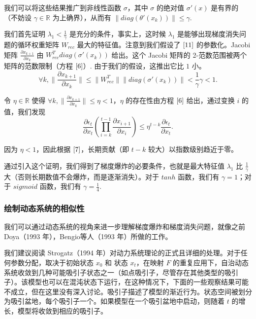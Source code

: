 我们可以将这些结果推广到非线性函数 \(\sigma\)，其中 \(\sigma\) 的绝对值 \(\sigma '(x)\) 是有界的（不妨设 \(\gamma\in\mathbb{R}\) 为上确界），从而有 \(\|diag(\theta '(x_k))\|\leq\gamma\).

我们首先证明 \(\lambda_1<\frac{1}{\gamma}\) 是充分的条件，事实上，这时候 \(\lambda_1\) 是能够出现梯度消失问题的循环权重矩阵 \(W_{rec}\) 最大的特征值。注意到我们假设了 \(\eqref{11}\) 的参数化。Jacobi 矩阵 \(\frac{\partial x_{k+1}}{\partial x_k}\) 由 \(W_{rec}^T diag(\sigma '(x_k))\) 给出。这个 Jacobi 矩阵的 2-范数范围被两个矩阵的范数限制（方程 \(\eqref{6}\)）. 由于我们的假设，这推出它比 \(1\) 小。
\begin{equation}\label{6}
  \forall k, \|\frac{\partial x_{k+1}}{\partial x_k}\|\leq\|W_{rec}^T\|\|diag(\sigma '(x_k))\|<\frac{1}{\gamma}\gamma<1.
\end{equation}

令 \(\eta\in\mathbb{R}\) 使得 \(\forall k, \|\frac{\partial x_{k+1}}{\partial x_k}\|\leq\eta<1\)，\(\eta\) 的存在性由方程 \(\eqref{6}\) 给出，通过变换 \(i\) 的值，我们发现
\begin{equation}\label{7}
  \frac{\partial\epsilon_t}{\partial x_t}(\prod_{i=k}^{t-1}\frac{\partial x_{i+1}}{\partial x_i})\leq\eta^{t-k}\frac{\partial\epsilon_t}{\partial x_t}.
\end{equation}

因为 \(\eta<1\)，因此根据 \(\eqref{7}\)，长期贡献（即 \(t-k\) 较大）以指数级别趋近于零。

通过引入这个证明，我们得到了梯度爆炸的必要条件，也就是最大特征值 \(\lambda_1\) 比 \(\frac{1}{\gamma}\) 大（否则长期数值不会爆炸，而是逐渐消失）。对于 \(tanh\) 函数，我们有 \(\gamma = 1\)；对于 \(sigmoid\) 函数，我们有 \(\gamma = \frac{1}{4}\).

\subsubsection{绘制动态系统的相似性}\label{22-ux7ed8ux5236ux52a8ux6001ux7cfbux7edfux7684ux76f8ux4f3cux6027}

我们可以通过动态系统的视角来进一步理解梯度爆炸和梯度消失问题，就像之前 Doya（1993 年），Bengio等人（1993 年）所做的工作。

我们建议阅读 Strogatz（1994 年）对动力系统理论的正式且详细的处理。对于任何参数分配，取决于初始状态 \(x_0\) 和 状态 \(x_t\)，在映射 \(F\) 的重复应用下，自治动态系统收敛到几种可能吸引子状态之一（如点吸引子，尽管存在其他类型的吸引子）。该模型也可以在混沌状态下运行，在这种情况下，下面的一些观察结果可能不成立，但在这里没有深入讨论。吸引子描述了模型的渐近行为。状态空间被划分为吸引盆地，每个吸引子一个。如果模型在一个吸引盆地中启动，则随着 \(t\) 的增长，模型将收敛到相应的吸引子。

